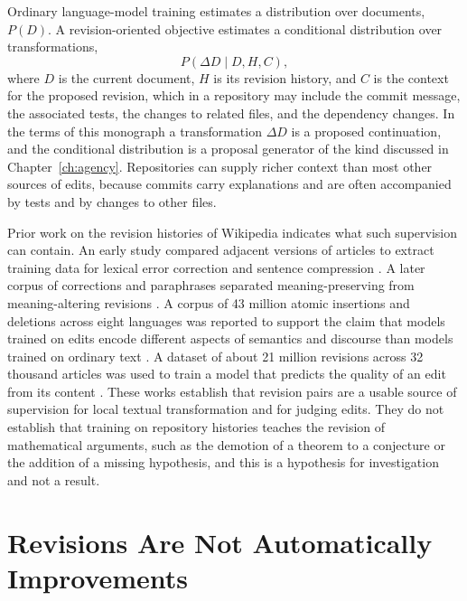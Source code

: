 \documentclass[12pt,oneside,openany]{book}
\theoremstyle{spherepop}
\theoremstyle{remarkstyle}
\begin{document}
Ordinary language-model training estimates a distribution over documents, $P(D)$. A revision-oriented objective estimates a conditional distribution over transformations,
\[
P(\Delta D\mid D,H,C),
\]
where $D$ is the current document, $H$ is its revision history, and $C$ is the context for the proposed revision, which in a repository may include the commit message, the associated tests, the changes to related files, and the dependency changes. In the terms of this monograph a transformation $\Delta D$ is a proposed continuation, and the conditional distribution is a proposal generator of the kind discussed in Chapter~\ref{ch:agency}. Repositories can supply richer context than most other sources of edits, because commits carry explanations and are often accompanied by tests and by changes to other files.

Prior work on the revision histories of Wikipedia indicates what such supervision can contain. An early study compared adjacent versions of articles to extract training data for lexical error correction and sentence compression \cite{nelken}. A later corpus of corrections and paraphrases separated meaning-preserving from meaning-altering revisions \cite{max}. A corpus of 43 million atomic insertions and deletions across eight languages was reported to support the claim that models trained on edits encode different aspects of semantics and discourse than models trained on ordinary text \cite{faruqui}. A dataset of about 21 million revisions across 32 thousand articles was used to train a model that predicts the quality of an edit from its content \cite{sarkar}. These works establish that revision pairs are a usable source of supervision for local textual transformation and for judging edits. They do not establish that training on repository histories teaches the revision of mathematical arguments, such as the demotion of a theorem to a conjecture or the addition of a missing hypothesis, and this is a hypothesis for investigation and not a result.

\section{Revisions Are Not Automatically Improvements}
\end{document}
